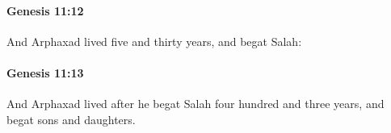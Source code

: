 		\paragraph{Genesis 11:12} %
			\label{GENESIS-11-12}

			And Arphaxad lived five and thirty years, and begat Salah:


		\paragraph{Genesis 11:13} %
			\label{GENESIS-11-13}

			And Arphaxad lived after he begat Salah four hundred and three years, and begat sons and daughters.


